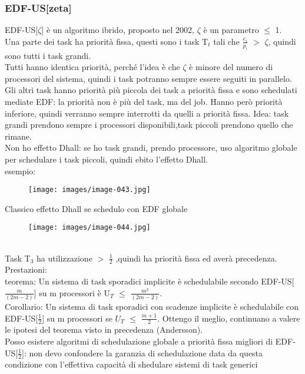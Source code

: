 \documentclass[12pt, oneside]{extbook}
\begin{document}
\subsubsection{EDF-US[zeta]}
EDF-US[$\zeta$] è un algoritmo ibrido, proposto nel 2002, $\zeta$ è un parametro $\leq$ 1.\\ Una parte dei task ha priorità fissa, questi sono i task T$_t$ tali che $\frac{e_i}{p_i}$ $>$ $\zeta$, quindi sono tutti i task grandi.\\ Tutti hanno identica priorità, perché l'idea è che $\zeta$ è minore del numero di processori del sistema, quindi i task potranno sempre essere seguiti in parallelo.\\ Gli altri task hanno priorità più piccola dei task a priorità fissa e sono schedulati mediate EDF: la priorità non è più del task, ma del job. Hanno però priorità inferiore, quindi verranno sempre interrotti da quelli a priorità fissa. Idea: task grandi prendono sempre i processori disponibili,task piccoli prendono quello che rimane.\\ Non ho effetto Dhall: se ho task grandi, prendo processore, uso algoritmo globale per schedulare i task piccoli, quindi ebito l'effetto Dhall.\\ esempio:\\
\begin{figure}[!h]
\centering
\texttt{[image: images/image-043.jpg]}
\end{figure}
Classico effetto Dhall se schedulo con EDF globale\\
\begin{figure}[!h]
\centering
\texttt{[image: images/image-044.jpg]}
\end{figure}
\\Task T$_3$ ha utilizzazione $>$ $\frac{1}{2}$ ,quindi ha priorità fissa ed averà precedenza.\\ Prestazioni:\\ teorema: Un sistema di task sporadici implicite è  schedulabile secondo EDF-US[$\frac{m}{(2m-2)}$] su m processori è U$_T$ $\leq$ $\frac{m^2}{(2m-2)}$.\\ Corollario: Un sistema di task sporadici con scadenze implicite è schedulabile con EDF-US[$\frac{1}{2}$] su m processori se $U_T$ $\leq$ $\frac{m + 1}{2}$. Ottengo il meglio, continuano a valere le ipotesi del teorema visto in precedenza (Andersson).\\ Posso esistere algoritmi di schedulazione globale a priorità fissa migliori di EDF-US[$\frac{1}{2}$]: non devo confondere la garanzia di schedulazione data da questa condizione con l'effettiva capacità di shedulare sistemi di task generici
\end{document}
